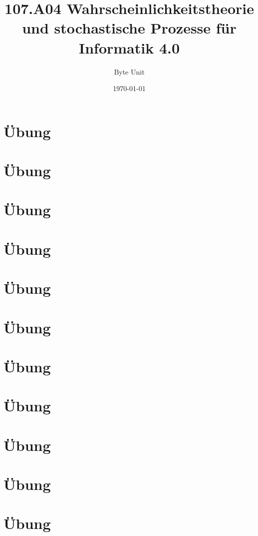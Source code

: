\documentclass{scrreprt}
\title{107.A04 Wahrscheinlichkeitstheorie und stochastische Prozesse 
für Informatik 4.0}
\author{Byte Unit}
\date{\today}
\renewcommand{\newExercPage}{\exercPage
            \newpage
            \chapter{Übung}}
\begin{document}
\maketitle
\tableofcontents

\newExercPage








\newExercPage








\newExercPage








\newExercPage
\newExercPage
\newExercPage
%
%
%
%
%
%
%

\newExercPage


\newExercPage




\newExercPage




\newExercPage

\newExercPage


\end{document}
